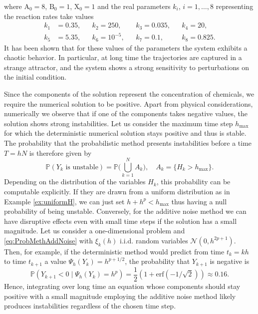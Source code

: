 \documentclass{siamart1116}
\numberwithin{theorem}{section}
\renewcommand{\Pr}{\mathbb{P}}
\begin{document}
where $\mathrm{A}_0 = 8$, $\mathrm{B}_0 = 1$, $\mathrm{X}_0 = 1$ and the real parameters $k_i$, $i = 1, \ldots, 8$ representing the reaction rates take values
\begin{equation}
\begin{aligned}
k_1 &= 0.35, &&k_2 = 250, &&k_3 = 0.035, &&k_4 = 20,\\
k_5 &= 5.35, &&k_6 = 10^{-5}, &&k_7 = 0.1, &&k_8 = 0.825.
\end{aligned}
\end{equation}            
It has been shown \cite{Ols83} that for these values of the parameters the system exhibits a chaotic behavior. In particular, at long time the trajectories are captured in a strange attractor, and the system shows a strong sensitivity to perturbations on the initial condition. 

Since the components of the solution represent the concentration of chemicals, we require the numerical solution to be positive. Apart from physical considerations, numerically we observe that if one of the components takes negative values, the solution shows strong instabilities. Let us consider the maximum time step $h_{\max}$ for which the deterministic numerical solution stays positive and thus is stable. The probability that the probabilistic method presents instabilities before a time $T = hN$ is therefore given by
\begin{equation}
	\Pr(Y_k \text{ is unstable}) = \Pr\big(\textstyle \bigcup_{k=1}^N A_k\big), \quad A_k = \{H_k > h_{\max}\}.
\end{equation}
Depending on the distribution of the variables $H_k$, this probability can be computable explicitly. If they are drawn from a uniform distribution as in Example \ref{ex:uniformH}, we can just set $h + h^p < h_{\max}$ thus having a null probability of being unstable. Conversely, for the additive noise method we can have disruptive effects even with small time steps if the solution has a small magnitude. Let us consider a one-dimensional problem and \eqref{eq:ProbMethAddNoise} with $\xi_k(h)$ i.i.d. random variables $\mathcal{N}(0, h^{2p + 1})$. Then, for example, if the deterministic method would predict from time $t_k = kh$ to time $t_{k+1}$ a value $\Psi_h(Y_k) = h^{p + 1/2}$, the probability that $Y_{k+1}$ is negative is
\begin{equation}
	\Pr(Y_{k+1} < 0 \mid \Psi_h(Y_k) = h^p) = \frac{1}{2}(1 + \mathrm{erf}(-1 / \sqrt{2})) \approx 0.16.
\end{equation}
Hence, integrating over long time an equation whose components should stay positive with a small magnitude employing the additive noise method likely produces instabilities regardless of the chosen time step.
\end{document}
